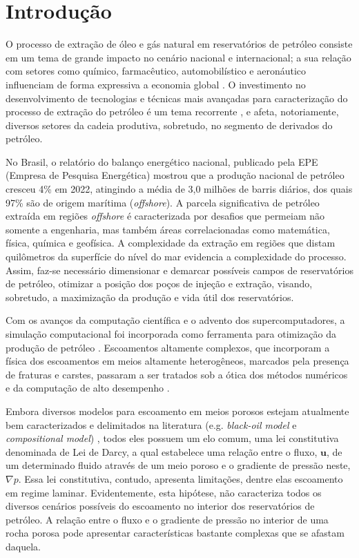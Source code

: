 \section{Introdução}\label{sec:introducao}

O processo de extração de óleo e gás natural em reservatórios de petróleo consiste em um tema de grande impacto no cenário nacional e internacional; a sua relação com setores como químico, farmacêutico, automobilístico e aeronáutico influenciam de forma expressiva a economia global \cite{Bilal2024,Agboola2024,Deku2024}. O investimento no desenvolvimento de tecnologias e técnicas mais avançadas para caracterização do processo de extração do petróleo é um tema recorrente \cite{Pillai2024,Asante2024,Kaushik2024}, e afeta, notoriamente, diversos setores da cadeia produtiva, sobretudo, no segmento de derivados do petróleo.

No Brasil, o relatório do balanço energético nacional, publicado pela EPE (Empresa de Pesquisa Energética) mostrou que a produção nacional de petróleo cresceu 4\% em 2022, atingindo a média de 3,0 milhões de barris diários, dos quais 97\% são de origem marítima (\textit{offshore}). A parcela significativa de petróleo extraída em regiões \textit{offshore} é caracterizada por desafios que permeiam não somente a engenharia, mas também áreas correlacionadas como matemática, física, química e geofísica. A complexidade da extração em regiões que distam quilômetros da superfície do nível do mar evidencia a complexidade do processo. Assim, faz-se necessário dimensionar e demarcar possíveis campos de reservatórios de petróleo, otimizar a posição dos poços de injeção e extração, visando, sobretudo, a maximização da produção e vida útil dos reservatórios. 

Com os avanços da computação científica e o advento dos supercomputadores, a simulação computacional foi incorporada como ferramenta para otimização da produção de petróleo \cite{Peaceman2010}. Escoamentos altamente complexos, que incorporam a física dos escoamentos em meios altamente heterogêneos, marcados pela presença de fraturas e carstes, passaram a ser tratados sob a ótica dos métodos numéricos e da computação de alto desempenho \cite{Sousa2023}. 

Embora diversos modelos para escoamento em meios porosos estejam atualmente bem caracterizados e delimitados na literatura (e.g. \textit{black-oil model} e \textit{compositional model}) \cite{Peaceman2010,Fanchi2006,Chen2006}, todos eles possuem um elo comum, uma lei constitutiva denominada de Lei de Darcy, a qual estabelece uma relação entre o fluxo, $\mathbf{u}$, de um determinado fluido através de um meio poroso e o gradiente de pressão neste, $\nabla p$. Essa lei constitutiva, contudo, apresenta limitações, dentre elas escoamento em regime laminar. Evidentemente, esta hipótese, não caracteriza todos os diversos cenários possíveis do escoamento no interior dos reservatórios de petróleo. A relação entre o fluxo e o gradiente de pressão no interior de uma rocha porosa pode apresentar características bastante complexas que se afastam daquela.

